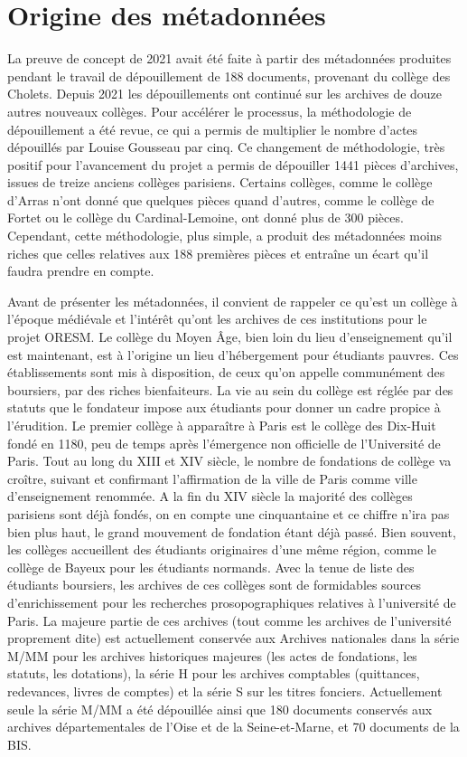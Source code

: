 \chapter{Origine des métadonnées}
La preuve de concept de 2021 avait été faite à partir des métadonnées produites pendant le travail de dépouillement de 188 documents, provenant du collège des Cholets. Depuis 2021 les dépouillements ont continué sur les archives de douze autres nouveaux collèges. Pour accélérer le processus, la méthodologie de dépouillement a été revue, ce qui  a permis de multiplier le nombre d'actes dépouillés par Louise Gousseau par cinq. Ce changement de méthodologie, très positif pour l'avancement du projet a permis de dépouiller 1441 pièces d'archives, issues de treize anciens collèges parisiens. Certains collèges, comme le collège d'Arras n'ont donné que quelques pièces quand d'autres, comme le collège de Fortet ou le collège du Cardinal-Lemoine, ont donné plus de 300 pièces. Cependant, cette méthodologie, plus simple, a produit des métadonnées moins riches que celles relatives aux 188 premières pièces et entraîne un écart qu'il faudra prendre en compte.
\par
Avant de présenter les métadonnées, il convient de rappeler ce qu'est un collège à l'époque médiévale et l'intérêt qu'ont les archives de ces institutions pour le projet ORESM. Le collège du Moyen Âge, bien loin du lieu d'enseignement qu'il est maintenant, est à l'origine un lieu d'hébergement pour étudiants pauvres. Ces établissements sont mis à disposition, de ceux qu'on appelle communément des boursiers, par des riches bienfaiteurs. La vie au sein du collège est réglée par des statuts que le fondateur impose aux étudiants pour donner un cadre propice à l'érudition. Le premier collège à apparaître à Paris est le collège des Dix-Huit fondé en 1180, peu de temps après l'émergence non officielle de l'Université de Paris. Tout au long du \textsc{XIII}\ieme{} et \textsc{XIV}\ieme{} siècle, le nombre de fondations de collège va croître, suivant et confirmant l'affirmation de la ville de Paris comme ville d'enseignement renommée. A la fin du \textsc{XIV}\ieme{} siècle la majorité des collèges parisiens sont déjà fondés, on en compte une cinquantaine et ce chiffre n'ira pas bien plus haut, le grand mouvement de fondation étant déjà passé. Bien souvent, les collèges accueillent des étudiants originaires d'une même région, comme le collège de Bayeux pour les étudiants normands. Avec la tenue de liste des étudiants boursiers, les archives de ces collèges sont de formidables sources d'enrichissement pour les recherches prosopographiques relatives à l'université de Paris. La majeure partie de ces archives (tout comme les archives de l'université proprement dite) est actuellement conservée aux Archives nationales dans la série M/MM pour les archives historiques majeures (les actes de fondations, les statuts, les dotations), la série H pour les archives comptables (quittances, redevances, livres de comptes)  et la série S sur les titres fonciers. Actuellement seule la série M/MM a été dépouillée ainsi que 180 documents conservés aux archives départementales de l'Oise et de la Seine-et-Marne, et 70 documents de la BIS.
